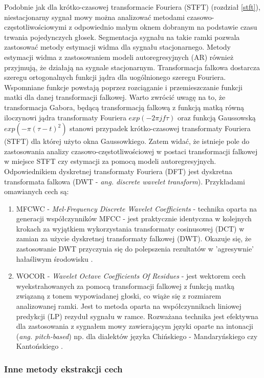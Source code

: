 Podobnie jak dla krótko-czasowej transformacie Fouriera (STFT) (rozdział \ref{stft}), niestacjonarny sygnał mowy można analizować metodami czasowo-częstotliwościowymi z odpowiednio małym oknem dobranym na podstawie czasu trwania pojedynczych głosek. Segmentacja sygnału na takie ramki pozwala zastosować metody estymacji widma dla sygnału stacjonarnego. Metody estymacji widma z zastosowaniem modeli autoregresyjnych (AR) również przyjmują, że działają na sygnale stacjonarnym. Transformacja falkowa dostarcza szeregu ortogonalnych funkcji jądra dla uogólnionego szeregu Fouriera. Wspomniane funkcje powstają poprzez rozciąganie i przemieszczanie funkcji matki dla danej transformacji falkowej. Warto zwrócić uwagę na to, że transformacja Gabora, będącą transformacją falkową z funkcją matką równą iloczynowi jądra transformaty Fouriera $ exp(-2\pi j f \tau)$ oraz funkcją Gaussowską $ exp(-\pi(\tau-t)^2) $ stanowi przypadek krótko-czasowej transformaty Fouriera (STFT) dla której użyto okna Gaussowkiego. Zatem widać, że istnieje pole do zastosowania analizy czasowo-częstotliwościowej w postaci transformacji falkowej w miejsce STFT czy estymacji za pomocą modeli autoregresyjnych. Odpowiednikiem dyskretnej transformaty Fouriera (DFT) jest dyskretna transformata falkowa (DWT - \textit{ang. discrete wavelet transform}).
Przykładami omawianych cech są:
\begin{enumerate}
  \item{MFCWC - \textit{Mel-Frequency Discrete Wavelet Coefficients}} - technika oparta na generacji współczynników MFCC - jest praktycznie identyczna w kolejnych krokach za wyjątkiem wykorzystania transformaty cosinusowej (DCT) w zamian za użycie dyskretnej transformaty falkowej (DWT). Okazuje się, że zastosowanie DWT przyczynia się do polepszenia rezultatów w 'agresywnie' hałaśliwym środowisku \cite{fosr}.
  \item{WOCOR - \textit{Wavelet Octave Coefficients Of Residues}} - jest wektorem cech wyekstrahowanych za pomocą transformacji falkowej z funkcją matką związaną z tonem wypowiadanej głoski, co wiąże się z rozmiarem analizowanej ramki. Jest to metoda oparta na współczynnikach liniowej predykcji (LP) rezyduł sygnału w ramce. Rozważana technika jest efektywna dla zastosowania z sygnałem mowy zawierającym języki oparte na intonacji (\textit{ang. pitch-based}) np. dla dialektów języka Chińskiego  - Mandaryńskiego czy Kantońskiego \cite{fosr}.
\end{enumerate}

\subsubsection{Inne metody ekstrakcji cech}
\label{otherfeatures}

